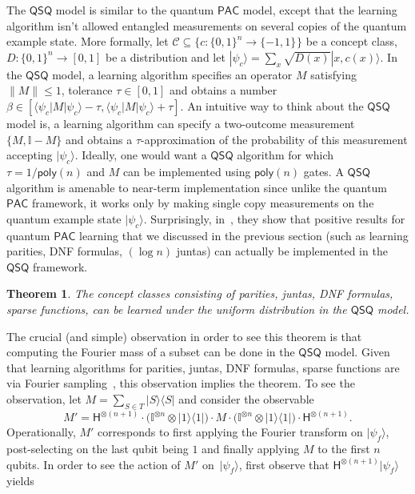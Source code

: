 \documentclass[11pt]{article}
\newcommand{\Cc}{\ensuremath{\mathcal{C}}}
\def\01{\{0,1\}}
\newcommand{\pmset}[1]{\{-1,1\}^{#1}} %
\newcommand{\id}{\ensuremath{\mathbb{I}}}
\newcommand{\poly}{\ensuremath{\mathsf{poly}}}
\newcommand{\PAC}{\ensuremath{\mathsf{PAC}}}
\def\01{\{0,1\}}
\newcommand{\ket}[1]{|#1\rangle}
\newcommand{\ketbra}[2]{|#1\rangle\langle#2|}
\newtheorem{theorem}{Theorem}
\begin{document}
The $\mathsf{QSQ}$ model is similar to the quantum $\PAC$ model, except that the learning algorithm isn't allowed entangled measurements on several copies of the quantum example state. More formally, let $\Cc\subseteq \{c:\01^n\rightarrow \pmset{}\}$ be a concept class,  $D:\01^n\rightarrow [0,1]$ be a distribution and let $\ket{\psi_c}=\sum_{x}\sqrt{D(x)}\ket{x,c(x)}$. In the $\mathsf{QSQ}$ model, a learning algorithm specifies an operator  $M$ satisfying $\|M\|\leq 1$,  tolerance $\tau \in [0,1]$ and obtains a number $\beta\in [\langle \psi_c| M |\psi_c\rangle-\tau ,\langle \psi_c| M |\psi_c\rangle+\tau]$. An intuitive way to think about the $\mathsf{QSQ}$ model is, a learning algorithm can specify a two-outcome measurement $\{M,\id-M\}$ and obtains a $\tau$-approximation of the probability of this measurement accepting $\ket{\psi_c}$. Ideally, one would want a $\mathsf{QSQ}$ algorithm for which $\tau=1/\poly(n)$ and $M$ can be implemented using $\poly(n)$ gates. A $\mathsf{QSQ}$ algorithm is amenable to near-term implementation since unlike the quantum $\PAC$ framework, it works only by making single copy measurements on the quantum example state $\ket{\psi_c}$. Surprisingly, in~\cite{arunachalam2020quantum}, they show that positive results for quantum $\PAC$ learning that we discussed in the previous section (such as learning parities, DNF formulas, $(\log n)$ juntas) can actually be implemented in the $\mathsf{QSQ}$ framework.
\begin{theorem}
\label{thm:everythingsq}
The concept classes consisting of parities, juntas, DNF formulas, sparse functions, can be learned under the uniform distribution in the $\mathsf{QSQ}$ model.
\end{theorem}
The crucial (and simple) observation in order to see this theorem is that computing the Fourier mass of a subset can be done in the $\mathsf{QSQ}$ model. Given that learning algorithms for parities, juntas, DNF formulas, sparse functions are via Fourier sampling~\cite{DBLP:journals/sigact/ArunachalamW17}, this observation implies the theorem. To see the observation, let $M=\sum_{S\in T}\ketbra{S}{S}$ and consider the observable
		$$
    M'=\mathsf{H}^{\otimes (n+1)} \cdot \Big( \id^{\otimes n}\otimes \ketbra{1}{1} \Big) \cdot M\cdot \Big( \id^{\otimes n}\otimes \ketbra{1}{1}\Big) \cdot \mathsf{H}^{\otimes (n+1)}.
		$$ 
    Operationally, $M'$ corresponds to first applying the
    Fourier transform on $\ket{\psi_f}$, {post-selecting on the last qubit being $1$} and finally applying $M$ to the first $n$ qubits.
 In order to see the action of $M'$ on~$\ket{\psi_f}$, first observe that $\mathsf{H}^{\otimes (n+1)}\ket{\psi_f}$ yields		
\end{document}
